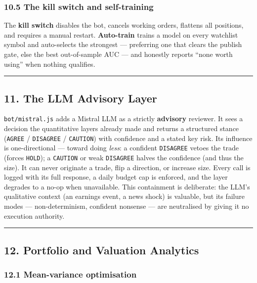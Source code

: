 \documentclass[
  11pt,
]{article}
\newcounter{none} %
\begin{document}
\subsubsection{10.5 The kill switch and
self-training}\label{the-kill-switch-and-self-training}

The \textbf{kill switch} disables the bot, cancels working orders,
flattens all positions, and requires a manual restart.
\textbf{Auto-train} trains a model on every watchlist symbol and
auto-selects the strongest --- preferring one that clears the publish
gate, else the best out-of-sample AUC --- and honestly reports ``none
worth using'' when nothing qualifies.

\begin{center}\rule{0.5\linewidth}{0.5pt}\end{center}

\subsection{11. The LLM Advisory Layer}\label{the-llm-advisory-layer}

\texttt{bot/mistral.js} adds a Mistral LLM as a strictly
\textbf{advisory} reviewer. It sees a decision the quantitative layers
already made and returns a structured stance (\texttt{AGREE} /
\texttt{DISAGREE} / \texttt{CAUTION}) with confidence and a stated key
risk. Its influence is one-directional --- toward doing \emph{less}: a
confident \texttt{DISAGREE} vetoes the trade (forces \texttt{HOLD}); a
\texttt{CAUTION} or weak \texttt{DISAGREE} halves the confidence (and
thus the size). It can never originate a trade, flip a direction, or
increase size. Every call is logged with its full response, a daily
budget cap is enforced, and the layer degrades to a no-op when
unavailable. This containment is deliberate: the LLM's qualitative
context (an earnings event, a news shock) is valuable, but its failure
modes --- non-determinism, confident nonsense --- are neutralised by
giving it no execution authority.

\begin{center}\rule{0.5\linewidth}{0.5pt}\end{center}

\subsection{12. Portfolio and Valuation
Analytics}\label{portfolio-and-valuation-analytics}

\subsubsection{12.1 Mean-variance
optimisation}\label{mean-variance-optimisation}
\end{document}
